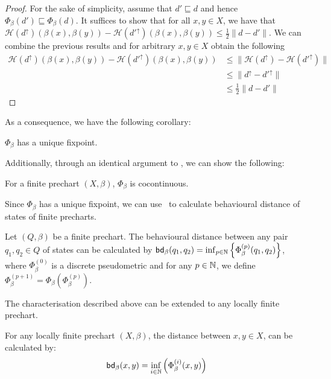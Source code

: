 \begin{proof}
	For the sake of simplicity, assume that $d' \sqsubseteq d$ and hence $\Phi_\beta(d') \sqsubseteq \Phi_{\beta}(d)$. It suffices to show that for all $x,y \in X$, we have that $\mathcal{H}(d^\uparrow)(\beta(x), \beta(y)) -  \mathcal{H}(d'^\uparrow)(\beta(x), \beta(y))  \leq \frac{1}{2}\|d-d'\|$. We can combine the previous results and for arbitrary $x,y \in X$ obtain the following
	\begin{align*}
		\mathcal{H}(d^\uparrow)(\beta(x), \beta(y)) -  \mathcal{H}(d'^\uparrow)(\beta(x), \beta(y)) & \leq \|\mathcal{H}(d^\uparrow) - \mathcal{H}(d'^\uparrow)\| \\
		&\leq \|d^\uparrow - d'^\uparrow\|\\
		& \leq \frac{1}{2} \|d - d'\|
	\end{align*}
\end{proof}
As a consequence, we have the following corollary:
\begin{corollary}
	$\Phi_\beta$ has a unique fixpoint.
\end{corollary}
Additionally, through an identical argument to , we can show the following:
\begin{lemma}\label{lem:cocontinuous}
	For a finite prechart $(X,\beta)$, $\Phi_\beta$ is cocontinuous.
\end{lemma}
Since $\Phi_\beta$ has a unique fixpoint, we can use~ to calculate behavioural distance of states of finite precharts.
\begin{lemma}\label{lem:finite_dist}
	Let $(Q, \beta)$ be a finite prechart. The behavioural distance between any pair $q_1, q_2 \in Q$ of states can be calculated by $\mathsf{bd}_\beta(q_1,q_2) = \inf_{p \in \mathbb{N}} \left \{ \Phi^{(p)}_\beta(q_1, q_2) \right\}$, where $\Phi^{(0)}_\beta$ is a discrete pseudometric and for any $p \in \mathbb{N}$, we define $\Phi^{(p+1)}_\beta = \Phi_\beta \left( \Phi^{(p)}_\beta\right)$.
\end{lemma}
The characterisation described above can be extended to any locally finite prechart.
\begin{corollary}\label{cor:kleene_locally_finite}
	For any locally finite prechart $(X,\beta)$, the distance between $x, y \in X$, can be calculated by:
	\[
		\mathsf{bd}_\beta(x,y) = \inf_{i \in \mathbb{N}} \left(\Phi_\beta^{(i)}(x,y)\right)
	\]
\end{corollary}
